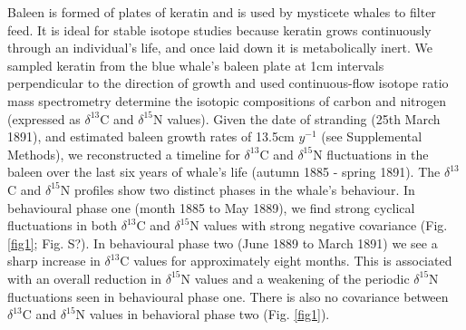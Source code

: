\documentclass[a4paper,12pt]{article}
\begin{document}
Baleen is formed of plates of keratin and is used by mysticete whales to filter feed. 
It is ideal for stable isotope studies because keratin grows continuously through an individual's life, and once laid down it is metabolically inert\cite{best1996stable}. 
We sampled keratin from the blue whale's baleen plate at 1cm intervals perpendicular to the direction of growth and used continuous-flow isotope ratio mass spectrometry determine the isotopic compositions of carbon and nitrogen (expressed as $\delta^{13}$C and $\delta^{15}$N values). 
Given the date of stranding (25th March 1891), and estimated baleen growth rates of 13.5cm $y^{-1}$ (see Supplemental Methods), we reconstructed a timeline for $\delta^{13}$C and $\delta^{15}$N fluctuations in the baleen over the last six years of whale's life (autumn 1885 - spring 1891). The $\delta^{13}$C and $\delta^{15}$N profiles show two distinct phases in the whale's behaviour. 
In behavioural phase one (month 1885 to May 1889), we find strong cyclical fluctuations in both $\delta^{13}$C and $\delta^{15}$N values with strong negative covariance (Fig. \ref{fig1}; Fig. S?). 
In behavioural phase two (June 1889 to March 1891) we see a sharp increase in $\delta^{13}$C values for approximately eight months.
This is associated with an overall reduction in $\delta^{15}$N values and a weakening of the periodic $\delta^{15}$N fluctuations seen in behavioural phase one. 
There is also no covariance between $\delta^{13}$C and $\delta^{15}$N values in behavioral phase two (Fig. \ref{fig1}). 


\end{document}
